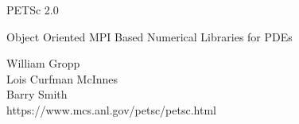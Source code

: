 %
%
\def\stripe{\ifvmode\else\par\vskip-\baselineskip\vskip12pt\fi
\hbox to \hsize{\leaders\hrule height 4.5pt\hfil}\vskip-\baselineskip
            \vskip 3.5pt
            \hbox to \hsize{\leaders\hrule height 1.5pt\hfil}
            \vskip -10pt}
\def\vt{\protect\begin{slide}}
\def\ve{\vfil\protect\end{slide}}
\def\vtt#1{\begin{slide}{}{\bf #1}\stripe\vfil\parskip8pt}
\def\vttstar#1{\begin{slide*}{}{\bf #1}\stripe\vfil\parskip8pt}
\def\vestar{\vfil\protect\end{slide*}}

\landscapeonly



\vt
\thispagestyle{empty}

\begin{center}
\Red {}
{\Huge \hspace{-1.5in} PETSc 2.0 } \\
\vspace{.4in}
{\Large Object Oriented MPI Based Numerical Libraries for PDEs}\\
\end{center}

\begin{center}
\Blue
William Gropp\\
Lois Curfman McInnes \\
Barry Smith\\
\Cyan
{\Large https://www.mcs.anl.gov/petsc/petsc.html}\\
\Black
\end{center}
\vspace{0cm}
\centerline{\hspace{.75in} }
\ve


